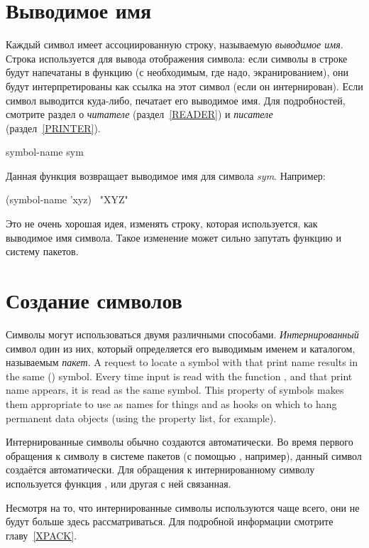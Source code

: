 \section{Выводимое имя}

Каждый символ имеет ассоциированную строку, называемую \emph{выводимое имя}.
Строка используется для вывода отображения символа:
если символы в строке будут напечатаны в функцию  (с необходимым, где
надо, экранированием), они будут интерпретированы как ссылка на этот символ
(если он интернирован). Если символ выводится куда-либо,  печатает
его выводимое имя.
Для подробностей, смотрите раздел о \emph{читателе} (раздел~\ref{READER}) и
\emph{писателе} (раздел~\ref{PRINTER}).

\begin{defun}[Функция]
symbol-name sym

Данная функция возвращает выводимое имя для символа \emph{sym}.
Например:
\begin{lisp}
(symbol-name 'xyz) \EV\ "XYZ"
\end{lisp}
Это не очень хорошая идея, изменять строку, которая используется, как выводимое
имя символа. Такое изменение может сильно запутать функцию  и систему
пакетов.
\end{defun}

\section{Создание символов}

Символы могут использоваться двумя различными способами.
\emph{Интернированный} символ один из них, который определяется его выводимым
именем и каталогом, называемым \emph{пакет}.
A request to locate a symbol with that print name results
in the same () symbol.  Every time input is read with the
function ,
and that print name appears, it is read as the same symbol.
This property of symbols makes them appropriate to use as names for
things and as hooks on which to hang permanent data objects
(using the property list, for example).

Интернированные символы обычно создаются автоматически. Во время первого
обращения к символу в системе пакетов (с помощью , например), данный
символ создаётся автоматически. Для обращения к
интернированному символу используется функция , или другая с ней
связанная.

Несмотря на то, что интернированные символы используются чаще всего, они не
будут больше здесь рассматриваться. Для подробной информации смотрите
главу~\ref{XPACK}.

